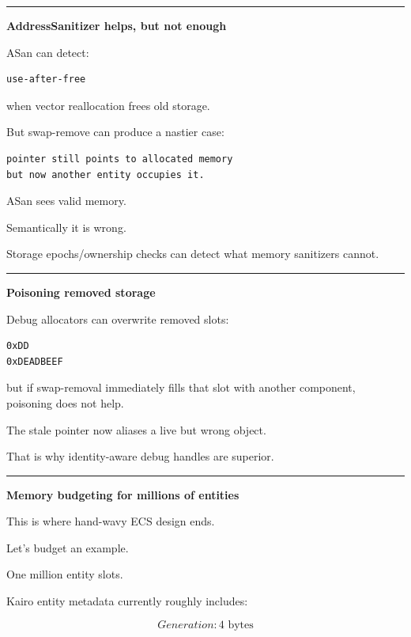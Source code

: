 \begin{center}\rule{0.5\linewidth}{0.5pt}\end{center}

\textbf{AddressSanitizer helps, but not enough}

ASan can detect:

\begin{verbatim}
use-after-free
\end{verbatim}

when vector reallocation frees old storage.

But swap-remove can produce a nastier case:

\begin{verbatim}
pointer still points to allocated memory
but now another entity occupies it.
\end{verbatim}

ASan sees valid memory.

Semantically it is wrong.

Storage epochs/ownership checks can detect what memory sanitizers cannot.

\begin{center}\rule{0.5\linewidth}{0.5pt}\end{center}

\textbf{Poisoning removed storage}

Debug allocators can overwrite removed slots:

\begin{verbatim}
0xDD
0xDEADBEEF
\end{verbatim}

but if swap-removal immediately fills that slot with another component, poisoning does not help.

The stale pointer now aliases a live but wrong object.

That is why identity-aware debug handles are superior.

\begin{center}\rule{0.5\linewidth}{0.5pt}\end{center}

\textbf{Memory budgeting for millions of entities}

This is where hand-wavy ECS design ends.

Let's budget an example.

One million entity slots.

Kairo entity metadata currently roughly includes:

\[
Generation:4\text{ bytes}
\]

